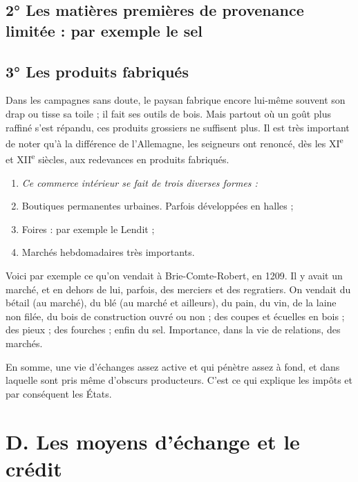 \documentclass[french,twoside]{book} %
\newlength{\listmod}
\newcommand{\listhead}[1]{\hspace{-1\listmod}\emph{#1}}
\begin{document}
\subsection[2° Les matières premières de provenance limitée : par exemple le sel]{2° Les matières premières de provenance limitée : par exemple le sel}
\subsection[3° Les produits fabriqués]{3° Les produits fabriqués}
\noindent Dans les campagnes sans doute, le paysan fabrique encore lui-même souvent son drap ou tisse sa toile ; il fait ses outils de bois. Mais partout où un goût plus raffiné s’est répandu, ces produits grossiers ne suffisent plus. Il est très important de noter qu’à la différence de l’Allemagne, les seigneurs ont renoncé, dès les XI\textsuperscript{e} et XII\textsuperscript{e} siècles, aux redevances en produits fabriqués.\par

\begin{enumerate}[itemsep=0pt,]
\item[]\listhead{Ce commerce intérieur se fait de trois diverses formes :}
\item Boutiques permanentes urbaines. Parfois développées en halles ;
\item Foires : par exemple le Lendit ;
\item Marchés hebdomadaires très importants.

\end{enumerate}\noindent Voici par exemple ce qu’on vendait à Brie-Comte-Robert, en 1209. Il y avait un marché, et en dehors de lui, parfois, des merciers et des regratiers. On vendait du bétail (au marché), du blé (au marché et ailleurs), du pain, du vin, de la laine non filée, du bois de construction ouvré ou non ; des coupes et écuelles en bois ; des pieux ; des fourches ; enfin du sel. Importance, dans la vie de relations, des marchés.\par
\bigbreak
\noindent En somme, une vie d’échanges assez active et qui pénètre assez à fond, et dans laquelle sont pris même d’obscurs producteurs. C’est ce qui explique les impôts et par conséquent les États.
\section[D. Les moyens d’échange et le crédit]{D. Les moyens d’échange et le crédit}
\label{c09d}
\end{document}
